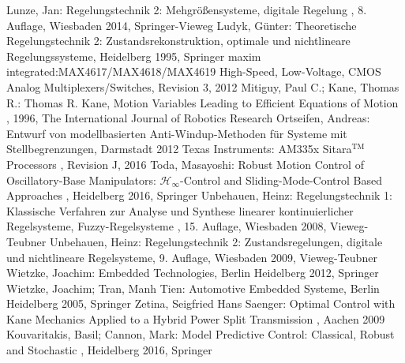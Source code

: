 \begin{thebibliography}{999}
 Lunze, Jan: \glqq Regelungstechnik 2: Mehgrößensysteme, digitale Regelung \grqq , 8. Auflage, Wiesbaden 2014, Springer-Vieweg
 Ludyk, Günter: \glqq Theoretische Regelungstechnik 2: Zustandsrekonstruktion, optimale und nichtlineare Regelungssysteme\grqq , Heidelberg 1995, Springer
 maxim integrated:\glqq MAX4617/MAX4618/MAX4619 High-Speed, Low-Voltage, CMOS Analog Multiplexers/Switches\grqq, Revision 3, 2012
 Mitiguy, Paul C.; Kane, Thomas R.: Thomas R. Kane, \glqq Motion Variables Leading to Efficient Equations of Motion \grqq , 1996, The International Journal of Robotics Research
 Ortseifen, Andreas: \glqq Entwurf von modellbasierten Anti-Windup-Methoden für Systeme mit Stellbegrenzungen\grqq, Darmstadt 2012
 Texas Instruments: \glqq AM335x Sitara$^{\text{TM}}$ Processors \grqq, Revision J, 2016
 Toda, Masayoshi: \glqq Robust Motion Control of Oscillatory-Base Manipulators: $\mathcal{H}_\infty$-Control and Sliding-Mode-Control Based Approaches \grqq , Heidelberg 2016, Springer
 Unbehauen, Heinz: \glqq Regelungstechnik 1: Klassische Verfahren zur Analyse und Synthese linearer kontinuierlicher Regelsysteme, Fuzzy-Regelsysteme \grqq , 15. Auflage, Wiesbaden 2008, Vieweg-Teubner
 Unbehauen, Heinz: \glqq Regelungstechnik 2: Zustandsregelungen, digitale und nichtlineare Regelsysteme\grqq , 9. Auflage, Wiesbaden 2009, Vieweg-Teubner
 Wietzke, Joachim: \glqq Embedded Technologies\grqq , Berlin Heidelberg 2012, Springer
 Wietzke, Joachim; Tran, Manh Tien: \glqq Automotive Embedded Systeme\grqq , Berlin Heidelberg 2005, Springer
 Zetina, Seigfried Hans Saenger: \glqq Optimal Control with Kane Mechanics Applied to a Hybrid Power Split Transmission \grqq , Aachen 2009
 Kouvaritakis, Basil; Cannon, Mark: \glqq Model Predictive Control: Classical, Robust and Stochastic \grqq , Heidelberg 2016, Springer




\end{thebibliography}